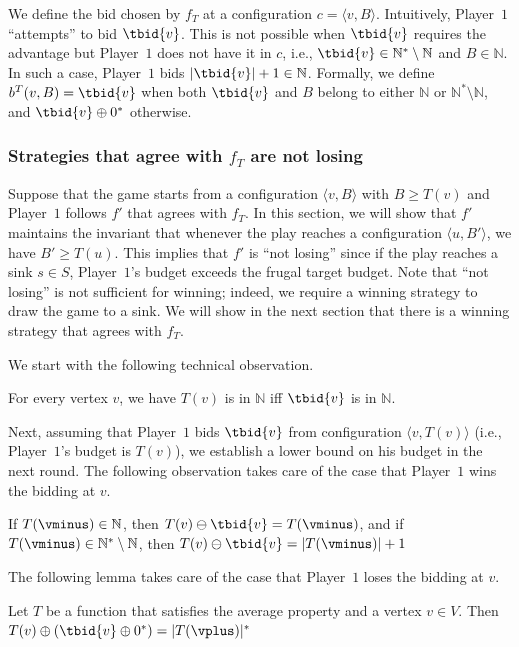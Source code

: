 \documentclass{theoretics}
\newcommand{\PO}{Player~$1$\xspace}
\newcommand{\Nat}{\mathbb{N}}
\newcommand{\Natstro}{\mathbb{N}^* \setminus \mathbb{N}}
\newcommand{\zug}[1]{\langle #1  \rangle}
\newcommand{\succb}[1]{#1 \oplus 0^*\xspace}
\newcommand{\absolut}[1]{|#1|}
\begin{document}
We define the bid chosen by $f_T$ at a configuration $c = \zug{v, B}$. 
Intuitively, \PO ``attempts'' to bid $\tbid{v}$. This is not possible when $\tbid{v}$ requires the advantage but \PO does not have it in $c$, i.e., $\tbid{v} \in \Nat^*\setminus \Nat$ and $B \in \Nat$. In such a case, \PO bids $\absolut{\tbid{v}} + 1 \in \Nat$. Formally, we define $b^T(v,B) = \tbid{v}$ when both $\tbid{v}$ and $B$ belong to either $\Nat$ or $\Nat^*\setminus \Nat$, and $\succb{\tbid{v}}$ otherwise. 

\subsubsection{Strategies that agree with $f_T$ are not losing}
Suppose that the game starts from a configuration $\zug{v, B}$ with $B \geq T(v)$ and \PO follows $f'$ that agrees with \(f_T\). In this section, we will show that $f'$ maintains the invariant that whenever the play reaches a configuration $\zug{u, B'}$, we have $B' \geq T(u)$. This implies that $f'$ is ``not losing'' since if the play reaches a sink $s \in S$, \PO's budget exceeds the frugal target budget. Note that ``not losing'' is not sufficient for winning; indeed, we require a winning strategy to draw the game to a sink. We will show in the next section that there is a winning strategy that agrees with $f_T$. 

We start with the following technical observation. 

\begin{observation}\label{obs: TmatcheswithBid}
	For every vertex $v$, we have \(T(v)\) is in \(\Nat\) iff \(\tbid{v}\) is in \(\Nat\).
\end{observation}

Next, assuming that \PO bids \(\tbid{v}\) from configuration $\zug{v, T(v)}$ (i.e., \PO's budget is $T(v)$), we establish a lower bound on his budget in the next round. The following observation takes care of the case that \PO wins the bidding at $v$. 

\begin{observation}\label{obs: AfterbidBudget}
	If \(T(\vminus) \in \Nat\), then \(T(v) \ominus \tbid{v}  = T(\vminus)\), and if \(T(\vminus) \in \Natstro\), then \(T(v) \ominus \tbid{v} = \absolut{T(\vminus)} + 1\)
\end{observation}

The following lemma takes care of the case that \PO loses the bidding at $v$. 

\begin{lemma}\label{lem:resultonT}
	Let $T$ be a function that satisfies the average property and a vertex $v \in V$. Then \(T(v) \oplus (\succb{\tbid{v}}) = \absolut{T(\vplus)}^*\)
\end{lemma}
\end{document}
